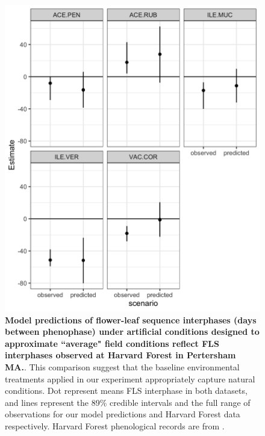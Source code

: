 \documentclass[11pt]{article}
\begin{document}
  \begin{figure}[h!]
    \centering
 \includegraphics[width=\textwidth]{..//Plots/fieldmodcomparisions.jpeg}
    \caption{\textbf{Model predictions of flower-leaf sequence interphases (days between phenophase) under artificial conditions designed to approximate ``average" field conditions reflect FLS interphases observed at Harvard Forest in Pertersham MA.}. This comparison suggest that the baseline environmental treatments  applied in our experiment appropriately capture natural conditions. Dot represent means FLS interphase in both datasets, and lines represent the 89\% credible intervals and the full range of observations for our model predictions and Harvard Forest data respectively.  Harvard Forest phenological records are from \citet{Okeefe2015}.}
    \label{fig:validate}
\end{figure}
\end{document}

